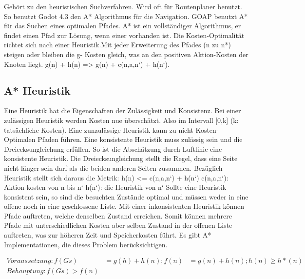 Gehört zu den heuristischen Suchverfahren. Wird oft für Routenplaner benutzt. So benutzt Godot 4.3 den A* Algorithmus für die Navigation. GOAP benutzt A* für das Suchen eines optimalen Pfades. A* ist ein vollständiger Algorithmus, er findet einen Pfad zur Lösung, wenn einer vorhanden ist. Die Kosten-Optimalität richtet sich nach einer Heuristik.Mit jeder Erweiterung des Pfades (n zu n*) steigen oder bleiben die g- Kosten gleich, was an den positiven Aktion-Kosten der Knoten liegt. g(n) + h(n) => g(n) + c(n,a,n‘) + h(n‘).

\subsection{A* Heuristik}
Eine Heuristik hat die Eigenschaften der Zulässigkeit und Konsistenz. Bei einer zulässigen Heuristik werden Kosten nue überschätzt. Also im Intervall [0,k] (k: tatsächliche Kosten).
Eine zunzulässige Heuristik kann zu nicht Kosten-Optimalen Pfaden führen. Eine konsistente Heuristik muss zulässig sein und die Dreiecksungleichung erfüllen. So ist die Abschätzung durch Luftlinie eine konsistente Heuristik. Die Dreiecksungleichung stellt die Regel, dass eine Seite nicht länger sein darf als die beiden anderen Seiten zusammen. Bezüglich Heuristik stellt sich daraus die Metrik: h(n) <= c(n,a,n‘) + h(n‘)
c(n,a,n‘): Aktion-kosten von n bis n‘
h(n‘): die Heuristik von n‘
Sollte eine Heuristik konsistent sein, so sind die besuchten Zustände optimal und müssen weder in eine offene noch in eine geschlossene Liste.
Mit einer inkonsistenten Heuristik können Pfade auftreten, welche denselben Zustand erreichen. Somit können mehrere Pfade mit unterschiedlichen Kosten aber selben Zustand in der offenen Liste auftreten, was zur höheren Zeit und Speicherkosten führt. Es gibt A* Implementationen, die dieses Problem berücksichtigen.

\begin{align}
Voraussetzung: f(Gs) &= g(h) + h(n); f(n) &= g(n) + h(n); h(n) \geq h*(n) \\
Behauptung: f(Gs) > f(n)
\end{align}
